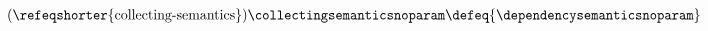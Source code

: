 \begin{definition}
  \begin{align} \tag{\refeqshorter{collecting-semantics}}
    \collectingsemanticsnoparam \defeq \{ \dependencysemanticsnoparam \}
  \end{align}
\end{definition}
